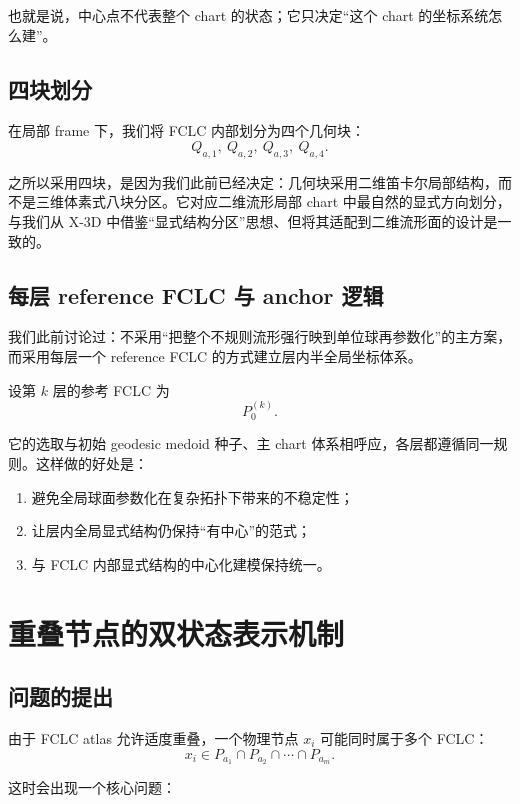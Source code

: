 \documentclass[12pt,a4paper]{ctexart}
\begin{document}
也就是说，中心点不代表整个 chart 的状态；它只决定“这个 chart 的坐标系统怎么建”。

\subsection{四块划分}

在局部 frame 下，我们将 FCLC 内部划分为四个几何块：
\[
Q_{a,1},\ Q_{a,2},\ Q_{a,3},\ Q_{a,4}.
\]

之所以采用四块，是因为我们此前已经决定：几何块采用二维笛卡尔局部结构，而不是三维体素式八块分区。它对应二维流形局部 chart 中最自然的显式方向划分，与我们从 X-3D 中借鉴“显式结构分区”思想、但将其适配到二维流形面的设计是一致的。

\subsection{每层 reference FCLC 与 anchor 逻辑}

我们此前讨论过：不采用“把整个不规则流形强行映到单位球再参数化”的主方案，而采用每层一个 reference FCLC 的方式建立层内半全局坐标体系。

设第 \(k\) 层的参考 FCLC 为
\[
P_0^{(k)}.
\]

它的选取与初始 geodesic medoid 种子、主 chart 体系相呼应，各层都遵循同一规则。这样做的好处是：

\begin{enumerate}[leftmargin=2em]
    \item 避免全局球面参数化在复杂拓扑下带来的不稳定性；
    \item 让层内全局显式结构仍保持“有中心”的范式；
    \item 与 FCLC 内部显式结构的中心化建模保持统一。
\end{enumerate}

\section{重叠节点的双状态表示机制}

\subsection{问题的提出}

由于 FCLC atlas 允许适度重叠，一个物理节点 \(x_i\) 可能同时属于多个 FCLC：
\[
x_i\in P_{a_1}\cap P_{a_2}\cap\cdots\cap P_{a_m}.
\]

这时会出现一个核心问题：
\end{document}
